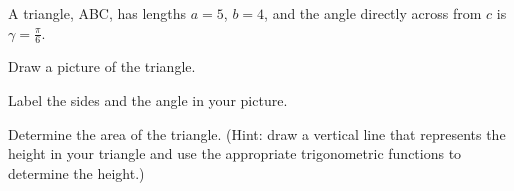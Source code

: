 
\begin{problem}
\item A triangle, ABC, has lengths $a=5$, $b=4$, and the angle
  directly across from $c$ is $\gamma=\frac{\pi}{6}$.
  \begin{subproblem}
  \item Draw a picture of the triangle.
    \vfill
  \item Label the sides and the angle in your picture.
  \item Determine the area of the triangle. (Hint: draw a vertical
    line that represents the height in your triangle and use the
    appropriate trigonometric functions to determine the height.)
    \vfill
  \end{subproblem}
\end{problem}


